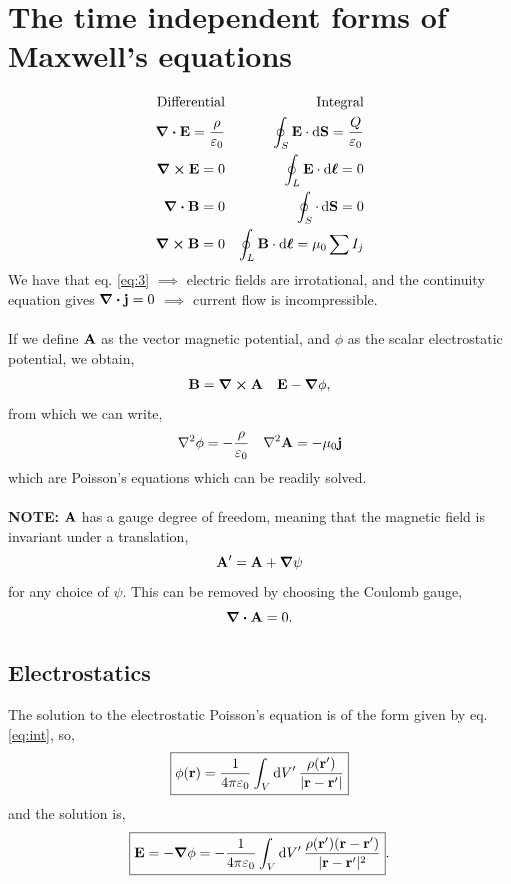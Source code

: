 \documentclass{book}
\begin{document}
\section{The time independent forms of Maxwell's equations}
\begin{align}
	\text{Differential} && \text{Integral}\\
	\div{\vb{E}} = \frac{\rho}{\varepsilon_0} && \oint_S\vb{E}\cdot\dd{\vb{S}} = \frac{Q}{\varepsilon_0} \label{eq:1} \\
	\curl{\vb{E}} = 0 && \oint_L \vb{E}\cdot\dd{\vb*{\ell}} = 0 \label{eq:2}\\
	\div{\vb{B}} = 0 && \oint_S \cdot\dd{\vb{S}} = 0 \label{eq:3}\\
	\curl{\vb{B}} = 0 && \oint_L\vb{B}\cdot\dd{\vb*{\ell}} = \mu_0 \sum I_j \label{eq:4}
\end{align}
We have that eq. \eqref{eq:3} $\implies$ electric fields are irrotational, and the continuity equation gives $\div{\vb{j}} = 0$ $\implies$ current flow is incompressible.
\\\\
If we define $\vb{A}$ as the vector magnetic potential, and $\phi$ as the scalar electrostatic potential, we obtain,
\begin{align}
	\vb{B} = \curl{\vb{A}} && \vb{E} - \grad \phi, \label{eq:potentials}
\end{align}
from which we can write,
\begin{align}
	\laplacian \phi = -\frac{\rho}{\varepsilon_0} && \laplacian \vb{A} = -\mu_0\vb{j}
\end{align}
which are Poisson's equations which can be readily solved.
\\\\
\textbf{NOTE:} $\vb{A}$ has a gauge degree of freedom, meaning that the magnetic field is invariant under a translation,
\begin{equation}
	\vb{A}' = \vb{A} + \grad \psi
\end{equation}
for any choice of $\psi$. This can be removed by choosing the Coulomb gauge,
\begin{equation}
	\div{\vb{A}} = 0.
\end{equation}
\subsection{Electrostatics}
The solution to the electrostatic Poisson's equation is of the form given by eq. \eqref{eq:int}, so,
\begin{equation}
	\boxed{\phi(\vb{r}) = \frac{1}{4\pi \varepsilon_0}\int_{V}\dd{V'} \frac{\rho(\vb{r}')}{|\vb{r} - \vb{r}'|}}
\end{equation}
and the solution is,
\begin{equation}
	\begin{split}
	\boxed{\vb{E} = -\grad\phi = -\frac{1}{4\pi\varepsilon_0} \int_V \dd{V'} \frac{\rho(\vb{r}')(\vb{r} - \vb{r}')}{|\vb{r} - \vb{r}'|^2}}.
	\end{split}
\end{equation}
\end{document}
